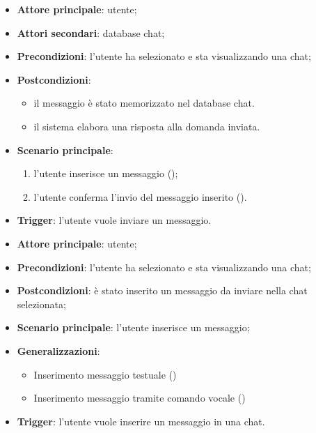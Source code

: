 \documentclass[10pt, a4paper]{article}
\begin{document}
    \begin{itemize}
        \item \textbf{Attore principale}: utente;
        \item \textbf{Attori secondari}: database chat;
        \item \textbf{Precondizioni}: l’utente ha selezionato e sta visualizzando una chat;
        \item \textbf{Postcondizioni}: 
            \begin{itemize}
                \item il messaggio è stato memorizzato nel database chat.
                \item il sistema elabora una risposta alla domanda inviata.
            \end{itemize}
        \item \textbf{Scenario principale}:
        \begin{enumerate}
            \item l'utente inserisce un messaggio ();
            \item l’utente conferma l'invio del messaggio inserito ().
        \end{enumerate}
        \item \textbf{Trigger}: l’utente vuole inviare un messaggio.
    \end{itemize}
    

    \begin{itemize}
        \item \textbf{Attore principale}: utente;
        \item \textbf{Precondizioni}: l’utente ha selezionato e sta visualizzando una chat;
        \item \textbf{Postcondizioni}: è stato inserito un messaggio da inviare nella chat selezionata;
        \item \textbf{Scenario principale}: l’utente inserisce un messaggio;
        \item \textbf{Generalizzazioni}:
            \begin{itemize}
                \item Inserimento messaggio testuale ()
                \item Inserimento messaggio tramite comando vocale ()
            \end{itemize}
        \item \textbf{Trigger}: l’utente vuole inserire un messaggio in una chat.
    \end{itemize}
    
\end{document}

